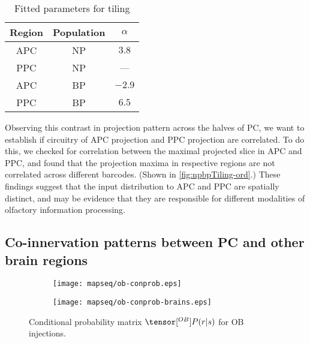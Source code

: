 \documentclass[../dissertation.tex]{subfiles}
\begin{document}
\begin{table}
    \centering
    \begin{tabular}{ccc}
        \toprule
        \textbf{Region} &   \textbf{Population} &   \textbf{$\alpha$}   \\
        \midrule
        APC             &   NP                  &   $3.8$               \\
        PPC             &   NP                  &   ---                 \\
        APC             &   BP                  &   $-2.9$              \\
        PPC             &   BP                  &   $6.5$               \\
        \bottomrule
    \end{tabular}
    \caption{Fitted parameters for tiling}
    \label{tab:mapseq-obtiling}
\end{table}

Observing this contrast in projection pattern across the halves of PC, we want to establish if circuitry of APC projection and PPC projection are correlated.
To do this, we checked for correlation between the maximal projected slice in APC and PPC, and found that the projection maxima in respective regions are not correlated across different barcodes.
(Shown in \cref{fig:npbpTiling-ord}.)
These findings suggest that the input distribution to APC and PPC are spatially distinct, and may be evidence that they are responsible for different modalities of olfactory information processing.

\subsection{Co-innervation patterns between PC and other brain regions}
\label{sec:mapseq-ob_conprob}

\begin{figure}[p]
    \centering
    \begin{subfigure}[c]{0.9\textwidth}
        \texttt{[image: mapseq/ob-conprob.eps]}
        \label{fig:obconprob-full}
    \end{subfigure}

    \begin{subfigure}[c]{0.8\textwidth}
        \texttt{[image: mapseq/ob-conprob-brains.eps]}
        \label{fig:obconprob-separate}
    \end{subfigure}

    \caption{Conditional probability matrix $\tensor[^{OB}]{P}{} (r | s)$ for OB injections.}
    \label{fig:obconprob}
\end{figure}
\end{document}
